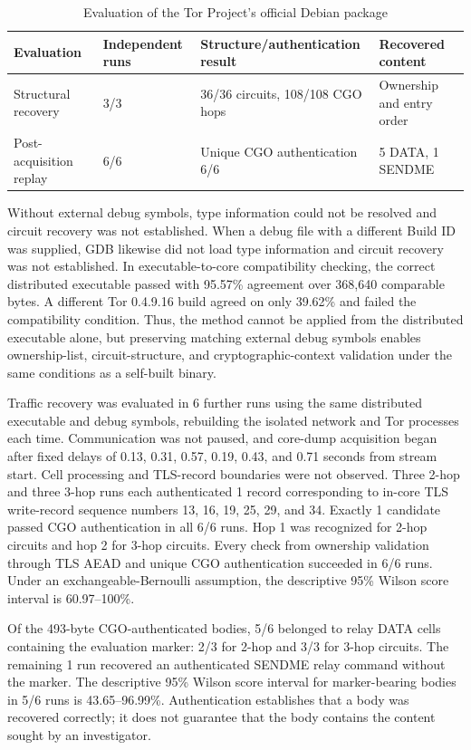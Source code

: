 \documentclass[10pt,a4paper]{article}
\begin{document}
\begin{table}[!tbp]
\centering
\caption{Evaluation of the Tor Project's official Debian package}
\label{tab:packaged}
\small
\begin{tabularx}{\linewidth}{L{29mm}L{18mm}YY}
\toprule
Evaluation & Independent runs & Structure/authentication result & Recovered content \\
\midrule
Structural recovery & 3/3 & 36/36 circuits, 108/108 CGO hops & Ownership and entry order \\
Post-acquisition replay & 6/6 & Unique CGO authentication 6/6 & 5 DATA, 1 SENDME \\
\bottomrule
\end{tabularx}
\end{table}

Without external debug symbols, type information could not be resolved and circuit recovery was not established. When a debug file with a different Build ID was supplied, GDB likewise did not load type information and circuit recovery was not established. In executable-to-core compatibility checking, the correct distributed executable passed with 95.57\% agreement over 368,640 comparable bytes. A different Tor 0.4.9.16 build agreed on only 39.62\% and failed the compatibility condition. Thus, the method cannot be applied from the distributed executable alone, but preserving matching external debug symbols enables ownership-list, circuit-structure, and cryptographic-context validation under the same conditions as a self-built binary.

Traffic recovery was evaluated in 6 further runs using the same distributed executable and debug symbols, rebuilding the isolated network and Tor processes each time. Communication was not paused, and core-dump acquisition began after fixed delays of 0.13, 0.31, 0.57, 0.19, 0.43, and 0.71 seconds from stream start. Cell processing and TLS-record boundaries were not observed. Three 2-hop and three 3-hop runs each authenticated 1 record corresponding to in-core TLS write-record sequence numbers 13, 16, 19, 25, 29, and 34. Exactly 1 candidate passed CGO authentication in all 6/6 runs. Hop 1 was recognized for 2-hop circuits and hop 2 for 3-hop circuits. Every check from ownership validation through TLS AEAD and unique CGO authentication succeeded in 6/6 runs. Under an exchangeable-Bernoulli assumption, the descriptive 95\% Wilson score interval is 60.97--100\%.

Of the 493-byte CGO-authenticated bodies, 5/6 belonged to relay DATA cells containing the evaluation marker: 2/3 for 2-hop and 3/3 for 3-hop circuits. The remaining 1 run recovered an authenticated SENDME relay command without the marker. The descriptive 95\% Wilson score interval for marker-bearing bodies in 5/6 runs is 43.65--96.99\%. Authentication establishes that a body was recovered correctly; it does not guarantee that the body contains the content sought by an investigator.
\end{document}
